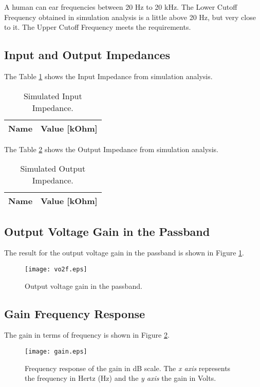 A human can ear frequencies between 20 Hz to 20 kHz. The Lower Cutoff Frequency obtained in simulation analysis is a little above 20 Hz, but very close to it. The Upper Cutoff Frequency meets the requirements.

\subsection{Input and Output Impedances}

The Table \ref{tab:sim_zin} shows the Input Impedance from simulation analysis.

\begin{table}[H]
	\centering
	\begin{tabular}{|l|r|}
		\hline    
		{\bf Name} & {\bf Value [kOhm]} \\ \hline
		
	\end{tabular}
	\caption{Simulated Input Impedance.}
	\label{tab:sim_zin}
\end{table}

The Table \ref{tab:sim_zout} shows the Output Impedance from simulation analysis.

\begin{table}[H]
	\centering
	\begin{tabular}{|l|r|}
		\hline    
		{\bf Name} & {\bf Value [kOhm]} \\ \hline
		
	\end{tabular}
	\caption{Simulated Output Impedance.}
	\label{tab:sim_zout}
\end{table}


\subsection{Output Voltage Gain in the Passband}
The result for the output voltage gain in the passband is shown in Figure \ref{fig:gain_sim}.

\begin{figure}[H] \centering
	\texttt{[image: vo2f.eps]}
	\caption{Output voltage gain in the passband.}
	\label{fig:gain_sim}
\end{figure}



\subsection{Gain Frequency Response}

The gain in terms of frequency is shown in Figure \ref{fig:teo_gaindB}.


\begin{figure}[H] \centering
	\texttt{[image: gain.eps]}
	\caption {Frequency response of the gain in dB scale. The \textit{x axis} represents the frequency in Hertz (Hz) and the \textit{y axis} the gain in Volts.}
	\label{fig:teo_gaindB}
\end{figure}






